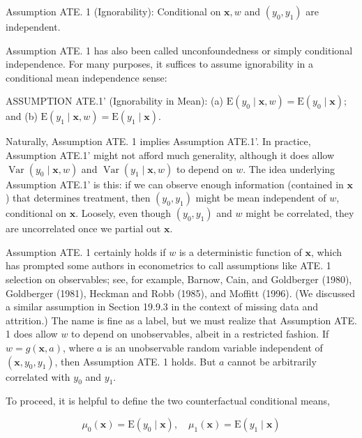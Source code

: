 \documentclass[10pt]{article}
\begin{document}
Assumption ATE. 1 (Ignorability): Conditional on $\mathbf{x}, w$ and $\left(y_{0}, y_{1}\right)$ are independent.

Assumption ATE. 1 has also been called unconfoundedness or simply conditional independence. For many purposes, it suffices to assume ignorability in a conditional mean independence sense:

ASSUMPTION ATE.1' (Ignorability in Mean): (a) $\mathrm{E}\left(y_{0} \mid \mathbf{x}, w\right)=\mathrm{E}\left(y_{0} \mid \mathbf{x}\right)$; and (b) $\mathrm{E}\left(y_{1} \mid \mathbf{x}, w\right)=\mathrm{E}\left(y_{1} \mid \mathbf{x}\right)$.

Naturally, Assumption ATE. 1 implies Assumption ATE.1'. In practice, Assumption ATE.1' might not afford much generality, although it does allow $\operatorname{Var}\left(y_{0} \mid \mathbf{x}, w\right)$ and $\operatorname{Var}\left(y_{1} \mid \mathbf{x}, w\right)$ to depend on $w$. The idea underlying Assumption ATE.1' is this: if we can observe enough information (contained in $\mathbf{x}$ ) that determines treatment, then $\left(y_{0}, y_{1}\right)$ might be mean independent of $w$, conditional on $\mathbf{x}$. Loosely, even though $\left(y_{0}, y_{1}\right)$ and $w$ might be correlated, they are uncorrelated once we partial out $\mathbf{x}$.

Assumption ATE. 1 certainly holds if $w$ is a deterministic function of $\mathbf{x}$, which has prompted some authors in econometrics to call assumptions like ATE. 1 selection on observables; see, for example, Barnow, Cain, and Goldberger (1980), Goldberger (1981), Heckman and Robb (1985), and Moffitt (1996). (We discussed a similar assumption in Section 19.9.3 in the context of missing data and attrition.) The name is fine as a label, but we must realize that Assumption ATE. 1 does allow $w$ to depend on unobservables, albeit in a restricted fashion. If $w=g(\mathbf{x}, a)$, where $a$ is an unobservable random variable independent of $\left(\mathbf{x}, y_{0}, y_{1}\right)$, then Assumption ATE. 1 holds. But $a$ cannot be arbitrarily correlated with $y_{0}$ and $y_{1}$.

To proceed, it is helpful to define the two counterfactual conditional means,


\begin{equation*}
\mu_{0}(\mathbf{x})=\mathrm{E}\left(y_{0} \mid \mathbf{x}\right), \quad \mu_{1}(\mathbf{x})=\mathrm{E}\left(y_{1} \mid \mathbf{x}\right) \tag{21.7}
\end{equation*}
\end{document}
